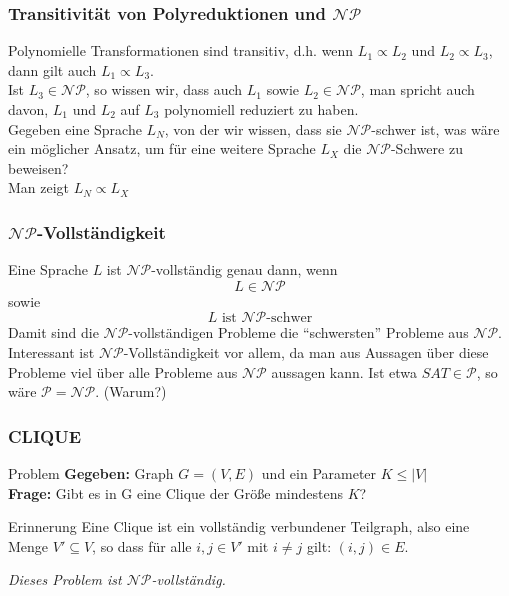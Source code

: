 \begin{frame}
\frametitle{Transitivität von Polyreduktionen und $\mathcal{NP}$}
Polynomielle Transformationen sind transitiv, d.h. wenn $L_1 \propto L_2$ und $L_2 \propto L_3$, dann gilt auch $L_1 \propto L_3$.\\[8pt]
Ist $L_3 \in \mathcal{NP}$, so wissen wir, dass auch $L_1$ sowie $L_2 \in \mathcal{NP}$, man spricht auch davon, $L_1$ und $L_2$ auf $L_3$ polynomiell reduziert zu haben.\\[8pt]
Gegeben eine Sprache $L_N$, von der wir wissen, dass sie $\mathcal{NP}$-schwer ist, was wäre ein möglicher Ansatz, um für eine weitere Sprache $L_X$ die $\mathcal{NP}$-Schwere zu beweisen?\\
\invincible\pause
Man zeigt $L_N \propto L_X$
\vincible
\end{frame}

\begin{frame}
\frametitle{$\mathcal{NP}$-Vollständigkeit}
Eine Sprache $L$ ist $\mathcal{NP}$-vollständig genau dann, wenn
$$L \in \mathcal{NP}$$ sowie $$L\mbox{ ist $\mathcal{NP}$-schwer}$$
Damit sind die $\mathcal{NP}$-vollständigen Probleme die "`schwersten"' Probleme aus $\mathcal{NP}$.\\
Interessant ist $\mathcal{NP}$-Vollständigkeit vor allem, da man aus Aussagen über diese Probleme viel über alle Probleme aus $\mathcal{NP}$ aussagen kann.
Ist etwa $SAT \in \mathcal{P}$, so wäre $\mathcal{P} = \mathcal{NP}$. (Warum?)
\end{frame}

\begin{frame}
\frametitle{CLIQUE}
\begin{block}{Problem}
\textbf{Gegeben:} Graph $G = (V, E)$ und ein Parameter $K \leq |V|$\\
\textbf{Frage:} Gibt es in G eine Clique der Größe mindestens $K$?
\end{block}
\begin{block}{Erinnerung}
Eine Clique ist ein vollständig verbundener Teilgraph, also eine Menge $V' \subseteq V$, so dass für alle $i,j \in V'$ mit $i\neq j$ gilt: $(i, j) \in E$.
\end{block}
\textit{Dieses Problem ist $\mathcal{NP}$-vollständig.}
\end{frame}

